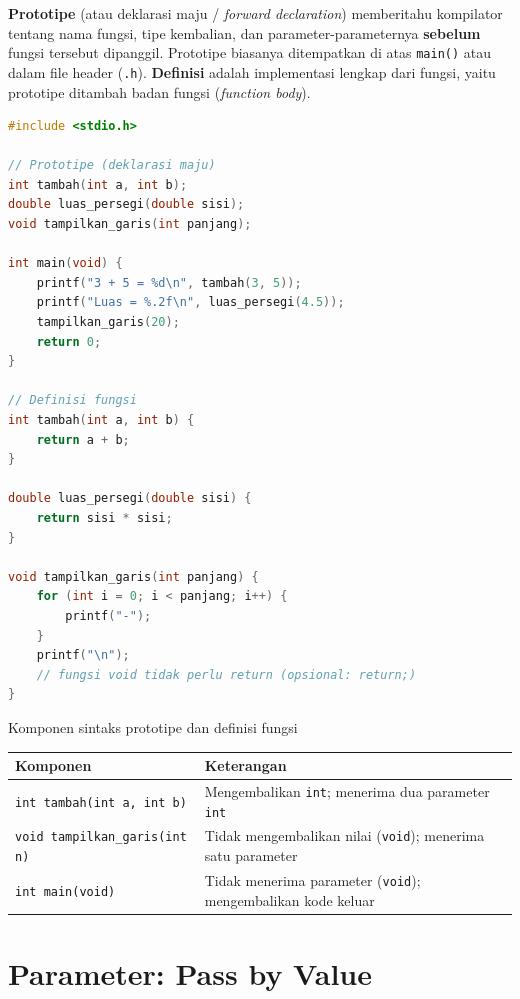 \documentclass[../main.tex]{subfiles}
\begin{document}
\textbf{Prototipe} (atau deklarasi maju / \textit{forward declaration}) memberitahu kompilator tentang nama fungsi, tipe kembalian, dan parameter-parameternya \textbf{sebelum} fungsi tersebut dipanggil. Prototipe biasanya ditempatkan di atas \texttt{main()} atau dalam file header (\texttt{.h}). \textbf{Definisi} adalah implementasi lengkap dari fungsi, yaitu prototipe ditambah badan fungsi (\textit{function body}).

\begin{lstlisting}[language=C,caption=Prototipe dan definisi fungsi]
#include <stdio.h>

// Prototipe (deklarasi maju)
int tambah(int a, int b);
double luas_persegi(double sisi);
void tampilkan_garis(int panjang);

int main(void) {
    printf("3 + 5 = %d\n", tambah(3, 5));
    printf("Luas = %.2f\n", luas_persegi(4.5));
    tampilkan_garis(20);
    return 0;
}

// Definisi fungsi
int tambah(int a, int b) {
    return a + b;
}

double luas_persegi(double sisi) {
    return sisi * sisi;
}

void tampilkan_garis(int panjang) {
    for (int i = 0; i < panjang; i++) {
        printf("-");
    }
    printf("\n");
    // fungsi void tidak perlu return (opsional: return;)
}
\end{lstlisting}

\begin{modultable}[]{Komponen sintaks prototipe dan definisi fungsi}
\begin{tabular}{|>{\raggedright\arraybackslash}p{4.2cm}|>{\raggedright\arraybackslash}p{9.0cm}|}
\hline
\textbf{Komponen} & \textbf{Keterangan} \\
\hline
\texttt{int tambah(int a, int b)} & Mengembalikan \texttt{int}; menerima dua parameter \texttt{int} \\
\hline
\texttt{void tampilkan\_garis(int n)} & Tidak mengembalikan nilai (\texttt{void}); menerima satu parameter \\
\hline
\texttt{int main(void)} & Tidak menerima parameter (\texttt{void}); mengembalikan kode keluar \\
\hline
\end{tabular}
\end{modultable}

\section{Parameter: Pass by Value}
\end{document}
